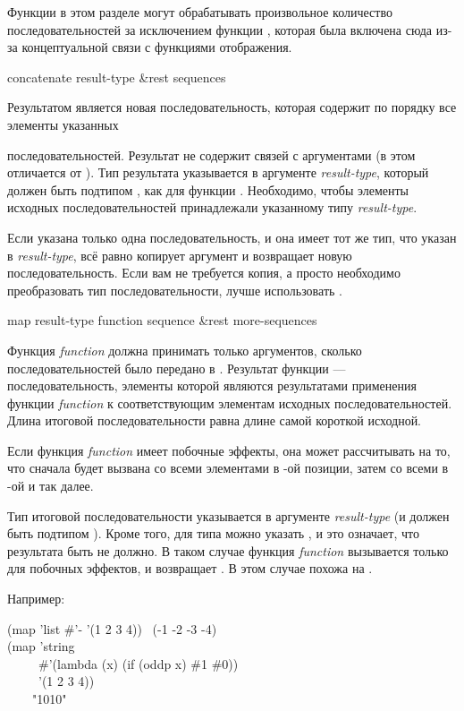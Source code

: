 Функции в этом разделе могут обрабатывать произвольное количество
последовательностей за исключением функции , которая была включена
сюда из-за концептуальной связи с функциями отображения.

\begin{defun}[Функция]
concatenate result-type &rest sequences

Результатом является новая последовательность, которая содержит по порядку все
элементы указанных
\item последовательностей. Результат не содержит связей с
аргументами (в этом  отличается от ). Тип
результата указывается в аргументе \emph{result-type}, который должен быть
подтипом , как для функции .
Необходимо, чтобы элементы исходных последовательностей принадлежали указанному
типу \emph{result-type}.

Если указана только одна последовательность, и она имеет тот же тип, что
указан в \emph{result-type},  всё равно копирует аргумент и
возвращает новую последовательность. Если вам не требуется копия, а просто
необходимо преобразовать тип последовательности, лучше использовать
.
\end{defun}

\begin{defun}[Функция]
map result-type function sequence &rest more-sequences

Функция \emph{function} должна принимать только аргументов, сколько
последовательностей было передано в . 
Результат функции  --- последовательность, элементы которой являются
результатами применения функции \emph{function} к соответствующим элементам
исходных последовательностей. Длина итоговой последовательности равна длине
самой короткой исходной.

Если функция \emph{function} имеет побочные эффекты, она может рассчитывать на
то, что сначала будет вызвана со всеми элементами в -ой позиции, затем со
всеми в -ой и так далее.

Тип итоговой последовательности указывается в аргументе \emph{result-type} (и
должен быть подтипом ).
Кроме того, для типа можно указать {\nil}, и это означает, что результата быть
не должно. В таком случае функция \emph{function} вызывается только для побочных
эффектов, и  возвращает {\nil}. В этом случае  похожа на
.

Например:
\begin{lisp}
(map 'list \#'- '(1 2 3 4)) \EV\ (-1 -2 -3 -4) \\
(map 'string \\
~~~~~\#'(lambda (x) (if (oddp x) \#{\Xbackslash}1 \#{\Xbackslash}0)) \\
~~~~~'(1 2 3 4)) \\
~~~\EV\ "1010"
\end{lisp}
\end{defun}


